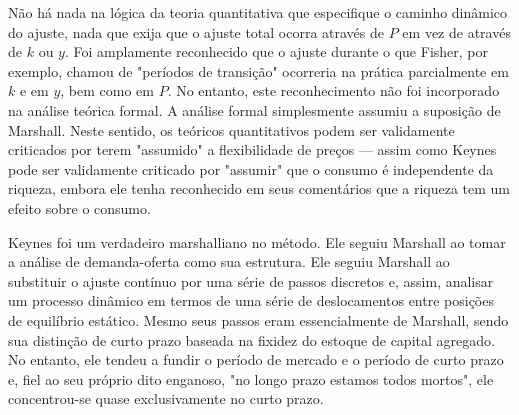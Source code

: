 \documentclass[12pt]{article}
\begin{document}
Não há nada na lógica da teoria quantitativa que especifique o caminho dinâmico do ajuste, nada que exija que o ajuste total ocorra através de $P$ em vez de através de $k$ ou $y$. Foi amplamente reconhecido que o ajuste durante o que Fisher, por exemplo, chamou de "períodos de transição" ocorreria na prática parcialmente em $k$ e em $y$, bem como em $P$. No entanto, este reconhecimento não foi incorporado na análise teórica formal. A análise formal simplesmente assumiu a suposição de Marshall. Neste sentido, os teóricos quantitativos podem ser validamente criticados por terem "assumido" a flexibilidade de preços — assim como Keynes pode ser validamente criticado por "assumir" que o consumo é independente da riqueza, embora ele tenha reconhecido em seus comentários que a riqueza tem um efeito sobre o consumo.

Keynes foi um verdadeiro marshalliano no método. Ele seguiu Marshall ao tomar a análise de demanda-oferta como sua estrutura. Ele seguiu Marshall ao substituir o ajuste contínuo por uma série de passos discretos e, assim, analisar um processo dinâmico em termos de uma série de deslocamentos entre posições de equilíbrio estático. Mesmo seus passos eram essencialmente de Marshall, sendo sua distinção de curto prazo baseada na fixidez do estoque de capital agregado. No entanto, ele tendeu a fundir o período de mercado e o período de curto prazo e, fiel ao seu próprio dito enganoso, "no longo prazo estamos todos mortos", ele concentrou-se quase exclusivamente no curto prazo.
\end{document}
